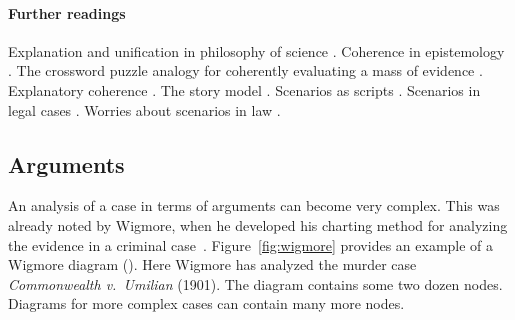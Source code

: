 \documentclass[10pt]{article}
\begin{document}
%
%



\paragraph{Further readings}

Explanation and unification 
in philosophy of science \citep{friedman1974}. 
Coherence in epistemology \citep{bonjour1985}.
The crossword puzzle analogy for coherently 
evaluating a mass of evidence \citep{haack2008}.
Explanatory coherence \citep{thagard2001}.
The story model \citep{penningtonHastie1993StoryModel}. 
Scenarios as scripts \citep{wagenaarEtal1993}.
Scenarios in legal cases \citep{griffin2013}. 
Worries about scenarios in law \citep{velleman2003}.






\subsection{Arguments}
\label{sec:coh-arg}

An analysis of a case in terms of arguments can become very complex. This was already noted by Wigmore, when he developed his charting method for analyzing the evidence in a criminal case~\citep{wigmore1913,wigmore1931}. Figure~\ref{fig:wigmore} provides an example of a Wigmore diagram (\citeyear{wigmore1931}). 
Here Wigmore has analyzed the murder case \textit{Commonwealth v.\ Umilian} (1901). 
 The diagram contains some two dozen nodes. Diagrams for more complex cases can contain many more nodes.
\end{document}
